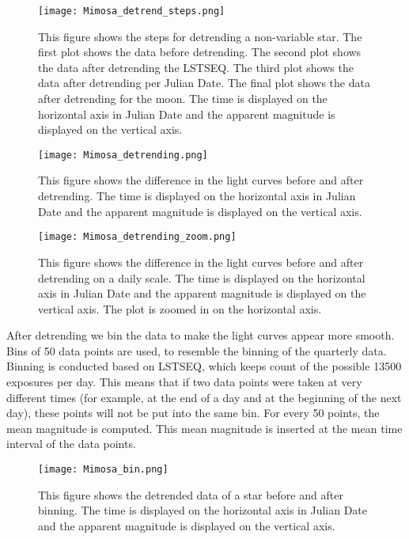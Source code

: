 \documentclass{aa}
\begin{document}
\begin{figure}
    \centering
    \texttt{[image: Mimosa\_detrend\_steps.png]}
    \caption{This figure shows the steps for detrending a non-variable star. The first plot shows the data before detrending.
    The second plot shows the data after detrending the LSTSEQ. The third plot shows the data after detrending per Julian Date. The final plot shows the data after detrending for the moon. The time is displayed on the horizontal axis in Julian Date and the apparent magnitude is displayed on the vertical axis.}
    \label{Mimosa_detrend_steps}
\end{figure}
\begin{figure}
    \centering
    \texttt{[image: Mimosa\_detrending.png]}
    \caption{This figure shows the difference in the light curves before and after detrending. The time is displayed on the horizontal axis in Julian Date and the apparent magnitude is displayed on the vertical axis.}
    \label{Mimosa_detrend}
\end{figure}
\begin{figure}
    \centering
    \texttt{[image: Mimosa\_detrending\_zoom.png]}
    \caption{This figure shows the difference in the light curves before and after detrending on a daily scale. The time is displayed on the horizontal axis in Julian Date and the apparent magnitude is displayed on the vertical axis. The plot is zoomed in on the horizontal axis.}
    \label{Mimosa_detrend_zoom}
\end{figure}

After detrending we bin the data to make the light curves appear more smooth. Bins of 50 data points are used, to resemble the binning of the quarterly data. Binning is conducted based on LSTSEQ, which keeps count of the possible 13500 exposures per day. This means that if two data points were taken at very different times (for example, at the end of a day and at the beginning of the next day), these points will not be put into the same bin. For every 50 points, the mean magnitude is computed. This mean magnitude is inserted at the mean time interval of the data points.


\begin{figure}
    \centering
    \texttt{[image: Mimosa\_bin.png]}
    \caption{This figure shows the detrended data of a star before and after binning. The time is displayed on the horizontal axis in Julian Date and the apparent magnitude is displayed on the vertical axis.}
    \label{Mimosa_bin}
\end{figure}
\end{document}
